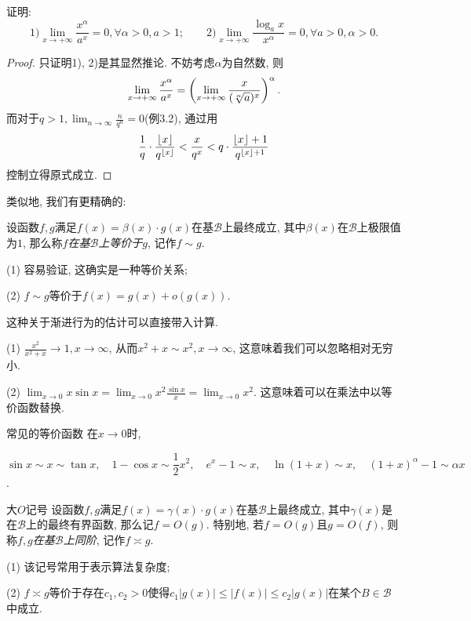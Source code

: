\begin{example}
	证明: $$1) \lim_{x \to +\infty} \frac{x^{\alpha}}{a^x}=0, \forall \alpha >0, a>1; \qquad 2) \lim_{x \to +\infty} \frac{\log_a x}{x^{\alpha}} = 0, \forall a>0, \alpha >0. $$
\end{example}
\begin{proof}
	只证明1), 2)是其显然推论. 不妨考虑$\alpha$为自然数, 则$$\lim_{x \to +\infty} \frac{x^{\alpha}}{a^x} =  \left( \lim_{x \to +\infty} \frac{x}{(\sqrt[\alpha]{a})^x}  \right)^{\alpha}. $$
	而对于$q>1, \lim_{n\to \infty} \frac{n}{q^n} = 0$(例3.2), 通过用$$\frac{1}{q} \cdot\frac{\lfloor x \rfloor}{q^{\lfloor x \rfloor}} < \frac{x}{q^x} < q \cdot \frac{\lfloor x \rfloor+1}{q^{\lfloor x \rfloor+1}}$$控制立得原式成立. 
\end{proof}

类似地, 我们有更精确的: 

\begin{definition}{}
	设函数$f,g$满足$f(x) = \beta (x) \cdot g(x)$在基$\mathcal{B}$上最终成立, 其中$\beta (x)$在$\mathcal{B}$上极限值为$1$, 那么称$f$\textit{在基$\mathcal{B}$上等价于$g$}, 记作$f \sim g$. 
\end{definition}
\begin{remark}
	(1) 容易验证, 这确实是一种等价关系;
	
	(2) $f \sim g$等价于$f(x) = g(x) + o(g(x))$. 
\end{remark}

这种关于渐进行为的估计可以直接带入计算. 

\begin{example}
	(1) $\frac{x^2}{x^2+x} \to 1, x \to \infty$, 从而$x^2+x \sim x^2, x \to \infty$, 这意味着我们可以忽略相对无穷小. 
	
	(2) $\lim_{x \to 0} x\sin x = \lim_{x \to 0} x^2 \frac{\sin x}{x} = \lim_{x \to 0} x^2$. 这意味着可以在乘法中以等价函数替换. 
\end{example}

\begin{proposition}{常见的等价函数}
	在$x \to 0$时, 
	
	\begin{center}
		$\sin x \sim x \sim \tan x, \quad 1-\cos x \sim \dfrac{1}{2}x^2,\quad e^x-1 \sim x,\quad \ln (1+x) \sim x,\quad (1+x)^{\alpha}-1 \sim \alpha x $.
	\end{center}
\end{proposition}

\begin{definition}{大$O$记号}
	设函数$f,g$满足$f(x) = \gamma (x) \cdot g(x)$在基$\mathcal{B}$上最终成立, 其中$\gamma (x)$是在$\mathcal{B}$上的最终有界函数, 那么记$f=O(g)$. 特别地, 若$f=O(g)$且$g=O(f)$, 则称$f,g$\textit{在基$\mathcal{B}$上同阶}, 记作$f \asymp g$. 
\end{definition}
\begin{remark}
	(1) 该记号常用于表示算法复杂度; 
	
	(2) $f \asymp g$等价于存在$c_1,c_2 >0$使得$c_1|g(x)| \leq |f(x)| \leq c_2|g(x)|$在某个$B \in \mathcal{B}$中成立. 
\end{remark}

